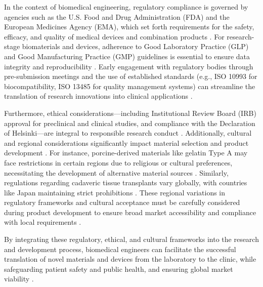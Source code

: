 In the context of biomedical engineering, regulatory compliance is governed by agencies such as the U.S. Food and Drug Administration (FDA) and the European Medicines Agency (EMA), which set forth requirements for the safety, efficacy, and quality of medical devices and combination products \cite{patel2019systematicreview, xiao2013mechanicaltesting, makris2011kneemeniscus}. For research-stage biomaterials and devices, adherence to Good Laboratory Practice (GLP) and Good Manufacturing Practice (GMP) guidelines is essential to ensure data integrity and reproducibility \cite{patel2019systematicreview, kwon2019surgicaltissue}. Early engagement with regulatory bodies through pre-submission meetings and the use of established standards (e.g., ISO 10993 for biocompatibility, ISO 13485 for quality management systems) can streamline the translation of research innovations into clinical applications \cite{xiao2013mechanicaltesting, ghodbane2019partialmeniscus}.

Furthermore, ethical considerations—including Institutional Review Board (IRB) approval for preclinical and clinical studies, and compliance with the Declaration of Helsinki—are integral to responsible research conduct \cite{patel2019systematicreview, makris2011kneemeniscus}. Additionally, cultural and regional considerations significantly impact material selection and product development \cite{2021synthesisapplication, makris2011kneemeniscus}. For instance, porcine-derived materials like gelatin Type A may face restrictions in certain regions due to religious or cultural preferences, necessitating the development of alternative material sources \cite{2021synthesisapplication, mandal2011multilayeredsilk}. Similarly, regulations regarding cadaveric tissue transplants vary globally, with countries like Japan maintaining strict prohibitions \cite{patel2019systematicreview, makris2011kneemeniscus}. These regional variations in regulatory frameworks and cultural acceptance must be carefully considered during product development to ensure broad market accessibility and compliance with local requirements \cite{xiao2013mechanicaltesting, kwon2019surgicaltissue}.

By integrating these regulatory, ethical, and cultural frameworks into the research and development process, biomedical engineers can facilitate the successful translation of novel materials and devices from the laboratory to the clinic, while safeguarding patient safety and public health, and ensuring global market viability \cite{patel2019systematicreview, xiao2013mechanicaltesting, makris2011kneemeniscus}.

